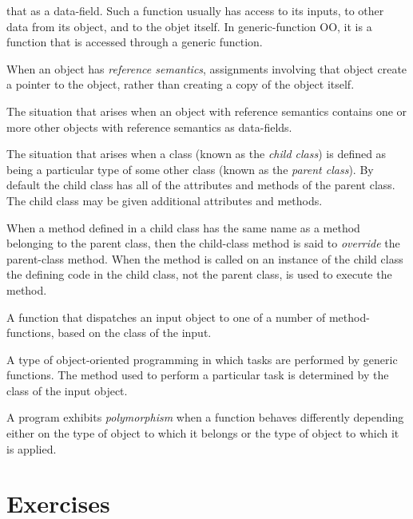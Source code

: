\documentclass[]{book}
\theoremstyle{definition}
\theoremstyle{definition}
\theoremstyle{remark}
\begin{document}
{\begin{description}
that as a data-field. Such a function usually has access to its inputs,
to other data from its object, and to the objet itself. In
generic-function OO, it is a function that is accessed through a generic
function.
\item[Reference Semantics \index{composition}]
When an object has \emph{reference semantics}, assignments involving
that object create a pointer to the object, rather than creating a copy
of the object itself.
\item[Composition \index{composition}]
The situation that arises when an object with reference semantics
contains one or more other objects with reference semantics as
data-fields.
\item[Inheritance \index{inheritance}]
The situation that arises when a class (known as the \emph{child class})
is defined as being a particular type of some other class (known as the
\emph{parent class}). By default the child class has all of the
attributes and methods of the parent class. The child class may be given
additional attributes and methods.
\item[Overriding \index{overriding}]
When a method defined in a child class has the same name as a method
belonging to the parent class, then the child-class method is said to
\emph{override} the parent-class method. When the method is called on an
instance of the child class the defining code in the child class, not
the parent class, is used to execute the method.
\item[Generic Function \index{generic function}]
A function that dispatches an input object to one of a number of
method-functions, based on the class of the input.
\item[Generic-Function OO \index{generic-function oo}]
A type of object-oriented programming in which tasks are performed by
generic functions. The method used to perform a particular task is
determined by the class of the input object.
\item[Polymorphism \index{polymorphism}]
A program exhibits \emph{polymorphism} when a function behaves
differently depending either on the type of object to which it belongs
or the type of object to which it is applied.
\end{description}

\newpage

\section*{Exercises}\label{exercises-10}

}
\end{document}
